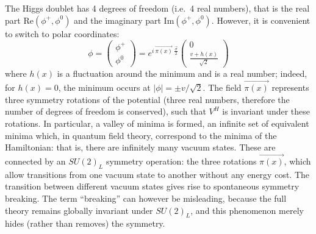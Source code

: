 \documentclass[11pt,a4paper,twoside,openright]{report}
\begin{document}
\noindent The Higgs doublet has 4 degrees of freedom (i.e.\ 4 real numbers), that is the real part \(\mathrm{Re}(\phi^+,\phi^0)\) and the imaginary part \(\mathrm{Im}(\phi^+,\phi^0)\). However, it is convenient to switch to polar coordinates:
\begin{equation}
\phi = \begin{pmatrix} \phi^+ \\ \phi^0 \end{pmatrix} = e^{i\ \overrightarrow{\pi (x)}\ \frac{\overrightarrow{\sigma}}{2}} \begin{pmatrix} 0 \\ \frac{v+h(x)}{\sqrt{2}} \end{pmatrix}
\end{equation}
where \(h(x)\) is a fluctuation around the minimum and is a real number; indeed, for \(h(x)=0\), the minimum occurs at \(|\phi|=\pm v/\sqrt{2}\). The field \(\overrightarrow{\pi(x)}\) represents three symmetry rotations of the potential (three real numbers, therefore the number of degrees of freedom is conserved), such that \(V^H\) is invariant under these rotations. In particular, a valley of minima is formed, an infinite set of equivalent minima which, in quantum field theory, correspond to the minima of the Hamiltonian: that is, there are infinitely many vacuum states. These are connected by an \(SU(2)_L\) symmetry operation: the three rotations \(\overrightarrow{\pi(x)}\), which allow transitions from one vacuum state to another without any energy cost. The transition between different vacuum states gives rise to spontaneous symmetry breaking. The term ``breaking'' can however be misleading, because the full theory remains globally invariant under \(SU(2)_L\), and this phenomenon merely hides (rather than removes) the symmetry.
\end{document}
